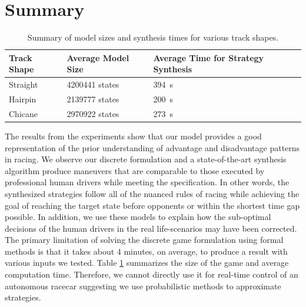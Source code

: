 \section{Summary}
\begin{table}
\centering
\begin{tabular}{|l|l|p{4.5cm}|}
\hline
\textbf{Track Shape} & \textbf{Average Model Size} & \textbf{Average Time for Strategy Synthesis} 
\\ \hline
Straight   & 4200441 states      & \SI{394}{s}       \\ \hline
Hairpin   & 2139777  states     & \SI{200}{s}       \\ \hline
Chicane   & 2970922 states & \SI{273}{s}      \\ \hline
\end{tabular}%
\caption{Summary of model sizes and synthesis times for various track shapes.}
\label{table:discrete_exp_summary}
\end{table}
The results from the experiments show that our model provides a good representation of the prior understanding of advantage and disadvantage patterns in racing. We observe our discrete formulation and a state-of-the-art synthesis algorithm produce maneuvers that are comparable to those executed by professional human drivers while meeting the specification. In other words, the synthesized strategies follow all of the nuanced rules of racing while achieving the goal of reaching the target state before opponents or within the shortest time gap possible. In addition, we use these models to explain how the sub-optimal decisions of the human drivers in the real life-scenarios may have been corrected. The primary limitation of solving the discrete game formulation using formal methods is that it takes about 4 minutes, on average, to produce a result with various inputs we tested. Table \ref{table:discrete_exp_summary} summarizes the size of the game and average computation time. Therefore, we cannot directly use it for real-time control of an autonomous racecar suggesting we use probabilistic methods to approximate strategies.